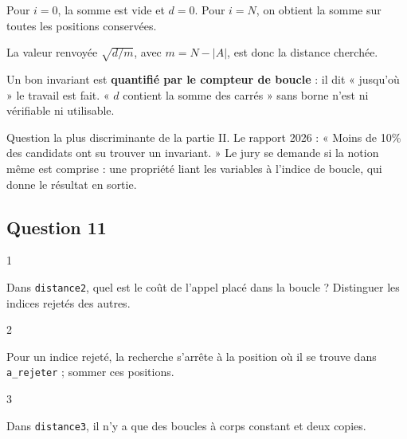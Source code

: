\documentclass[11pt,a4paper]{article}
\newcommand{\equationajustee}[1]{%
  \sbox{\boiteequation}{$\displaystyle #1$}%
  \ifdim\wd\boiteequation>\linewidth
    \[\resizebox{\linewidth}{!}{\usebox{\boiteequation}}\]%
  \else
    \[#1\]%
  \fi}
\begin{document}
\equationajustee{d = \sum_{\substack{0 \leqslant j < i \\ j \notin A}} \big(S_1[j] - S_2[j]\big)^2}

Pour \(i = 0\), la somme est vide et \(d = 0\). Pour \(i = N\), on obtient la somme sur toutes les positions conservées.

La valeur renvoyée \(\sqrt{d/m}\), avec \(m = N - |A|\), est donc la distance cherchée.

\begin{methode}

Un bon invariant est \textbf{quantifié par le compteur de boucle} : il dit « jusqu'où » le travail est fait. « \(d\) contient la somme des carrés » sans borne n'est ni vérifiable ni utilisable.

\end{methode}

\begin{jury}

Question la plus discriminante de la partie II. Le rapport 2026 : « Moins de 10\% des candidats ont su trouver un invariant. » Le jury se demande si la notion même est comprise : une propriété liant les variables à l'indice de boucle, qui donne le résultat en sortie.

\end{jury}

\hypertarget{question-11}{%
\subsection{Question 11}\label{question-11}}

\begin{indication}{1}

Dans \texttt{distance2}, quel est le coût de l'appel placé dans la boucle ? Distinguer les indices rejetés des autres.

\end{indication}

\begin{indication}{2}

Pour un indice rejeté, la recherche s'arrête à la position où il se trouve dans \texttt{a\_rejeter} ; sommer ces positions.

\end{indication}

\begin{indication}{3}

Dans \texttt{distance3}, il n'y a que des boucles à corps constant et deux copies.

\end{indication}
\end{document}
